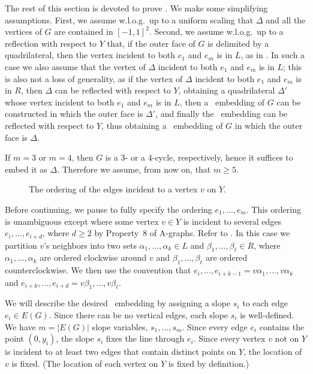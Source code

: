 The rest of this section is devoted to prove . We make some simplifying assumptions. First, we assume w.l.o.g.\ up to a uniform scaling that $\Delta$ and all the vertices of $G$ are contained in $[-1,1]^2$. Second, we assume w.l.o.g.\ up to a reflection  with respect to $Y$ that, if the outer face of $G$ is delimited by a quadrilateral, then the vertex incident to both $e_1$ and $e_m$ is in $L$, as in . In such a case we also assume that the vertex of $\Delta$ incident to both $e_1$ and $e_m$ is in $L$; this is also not a loss of generality, as if the vertex of $\Delta$ incident to both $e_1$ and $e_m$ is in $R$, then $\Delta$ can be reflected with respect to $Y$, obtaining a quadrilateral $\Delta'$ whose vertex incident to both $e_1$ and $e_m$ is in $L$, then a \Fary\ embedding of $G$ can be constructed in which the outer face is $\Delta'$, and finally the \Fary\ embedding can be reflected with respect to $Y$, thus obtaining a \Fary\ embedding of $G$ in which the outer face is $\Delta$. 

If $m=3$ or $m=4$, then $G$ is a 3- or a 4-cycle, respectively, hence it suffices to embed it as $\Delta$. Therefore we assume, from now on, that $m\ge 5$.  

\begin{figure}
		\caption{The ordering of the edges incident to a vertex $v$ on $Y$.}
\end{figure}
Before continuing, we pause to fully specify the ordering
$e_1,\ldots,e_m$. This ordering is unambiguous except where
some vertex $v\in Y$ is incident to several edges
$e_{i},\ldots,e_{i+d}$, where $d\ge 2$ by Property~8 of A-graphs. Refer to .  In this case we partition $v$'s neighbors into two
sets $\alpha_1,\ldots,\alpha_k\in L$ and $\beta_1,\ldots,\beta_\ell\in
R$, where $\alpha_1,\ldots,\alpha_k$ are ordered clockwise around $v$
and $\beta_1,\ldots,\beta_\ell$ are ordered counterclockwise.  We then use
the convention that $e_i,\ldots,e_{i+k-1}=v\alpha_1,\ldots,v\alpha_k$
and $e_{i+k},\ldots,e_{i+d}=v\beta_1,\ldots,v\beta_\ell$.

We will describe the desired \Fary\ embedding by assigning a slope
$s_i$ to each edge $e_i\in E(G)$.  
Since there can be no vertical edges, each slope $s_i$ is well-defined.
We have $m=|E(G)|$ slope variables, $s_1,\ldots,s_m$.  Since every edge
$e_i$ contains the point $(0,y_i)$, the slope $s_i$
fixes the line through $e_i$.  Since every vertex $v$ not on $Y$ is
incident to at least two edges that contain distinct points on $Y$,
the location of $v$ is fixed.  (The location of each vertex on $Y$
is fixed by definition.)

